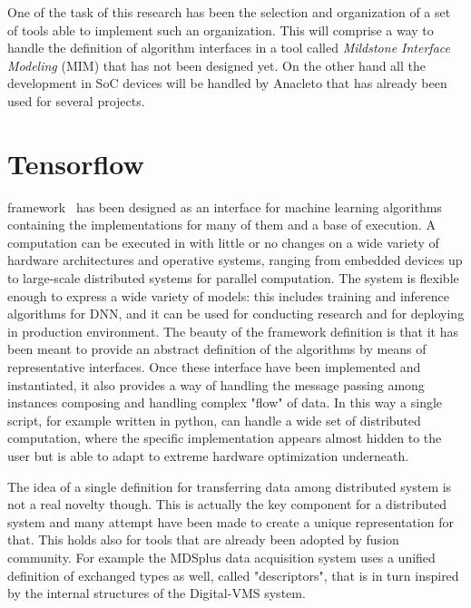 One of the task of this research has been the selection and organization of a set of tools able to implement such an organization. This will comprise a way to handle the definition of algorithm interfaces in a tool called \textit{Mildstone Interface Modeling} (MIM) that has not been designed yet. On the other hand all the development in SoC devices will be handled by Anacleto that has already been used for several projects.



%

\section{Tensorflow}

\Tensorflow framework~\cite{tensorflow2015-whitepaper} has been designed as an interface for machine learning algorithms containing the implementations for many of them and a base of execution. A computation can be executed in \Tensorflow with little or no changes on a wide variety of hardware architectures and operative systems, ranging from embedded devices up to large-scale distributed systems for parallel computation. The system is flexible enough to express a wide variety of models: this includes training and inference algorithms for \acs{DNN}, and it can be used for conducting research and for deploying in production environment. 
The beauty of the framework definition is that it has been meant to provide an abstract definition of the algorithms by means of representative interfaces. Once these interface have been implemented and instantiated, it also provides a way of handling the message passing among instances composing and handling complex "flow" of data. In this way a single script, for example written in python, can handle a wide set of distributed computation, where the specific implementation appears almost hidden to the user but is able to adapt to extreme hardware optimization underneath.

The idea of a single definition for transferring data among distributed system is not a real novelty though. This is actually the key component for a distributed system and many attempt have been made to create a unique representation for that. 
This holds also for tools that are already been adopted by fusion community. For example the MDSplus data acquisition system uses a unified definition of exchanged types as well, called "descriptors", that is in turn inspired by the internal structures of the Digital-VMS system.

